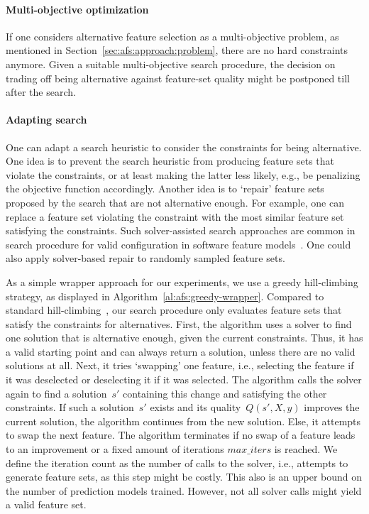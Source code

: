 \documentclass{article}
\theoremstyle{definition}
\begin{document}
\paragraph{Multi-objective optimization}

If one considers alternative feature selection as a multi-objective problem, as mentioned in Section~\ref{sec:afs:approach:problem}, there are no hard constraints anymore.
Given a suitable multi-objective search procedure, the decision on trading off being alternative against feature-set quality might be postponed till after the search.

\paragraph{Adapting search}

One can adapt a search heuristic to consider the constraints for being alternative.
One idea is to prevent the search heuristic from producing feature sets that violate the constraints, or at least making the latter less likely, e.g., be penalizing the objective function accordingly.
Another idea is to `repair' feature sets proposed by the search that are not alternative enough.
For example, one can replace a feature set violating the constraint with the most similar feature set satisfying the constraints.
Such solver-assisted search approaches are common in search procedure for valid configuration in software feature models~\cite{guo2018preserve, henard2015combining, white2010automated}.
One could also apply solver-based repair to randomly sampled feature sets.

As a simple wrapper approach for our experiments, we use a greedy hill-climbing strategy, as displayed in Algorithm~\ref{al:afs:greedy-wrapper}.
Compared to standard hill-climbing~\cite{kohavi1997wrappers}, our search procedure only evaluates feature sets that satisfy the constraints for alternatives.
First, the algorithm uses a solver to find one solution that is alternative enough, given the current constraints.
Thus, it has a valid starting point and can always return a solution, unless there are no valid solutions at all.
Next, it tries `swapping' one feature, i.e., selecting the feature if it was deselected or deselecting it if it was selected.
The algorithm calls the solver again to find a solution~$s'$ containing this change and satisfying the other constraints.
If such a solution~$s'$ exists and its quality~$Q(s',X,y)$ improves the current solution, the algorithm continues from the new solution.
Else, it attempts to swap the next feature.
The algorithm terminates if no swap of a feature leads to an improvement or a fixed amount of iterations $max\_iters$ is reached.
We define the iteration count as the number of calls to the solver, i.e., attempts to generate feature sets, as this step might be costly.
This also is an upper bound on the number of prediction models trained.
However, not all solver calls might yield a valid feature set.
\end{document}
